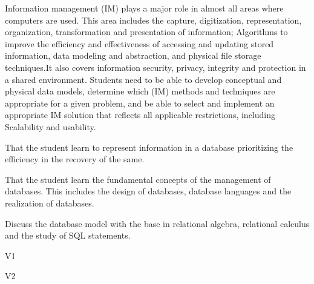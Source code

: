 \begin{syllabus}


\begin{justification}
Information management (IM) plays a major role in almost all areas where computers are used. 
This area includes the capture, digitization, representation, organization, transformation and presentation of information; 
Algorithms to improve the efficiency and effectiveness of accessing and updating stored information, data modeling and abstraction,
and physical file storage techniques.It also covers information security, privacy, integrity and protection in a shared environment. 
Students need to be able to develop conceptual and physical data models, determine which (IM) methods and techniques 
are appropriate for a given problem, and be able to select and implement an appropriate IM solution 
that reflects all applicable restrictions, including Scalability and usability.
\end{justification}

\begin{goals}
\item That the student learn to represent information in a database prioritizing the efficiency in the recovery of the same.
\item That the student learn the fundamental concepts of the management of databases. This includes the design of databases, database languages and the realization of databases.
\item Discuss the database model with the base in relational algebra, relational calculus and the study of SQL statements.
\end{goals}

\begin{outcomes}{V1}
    \item {}
    \item {}
    \item {}
    \item {}
\end{outcomes}

\begin{outcomes}{V2}
    \item {}
    \item {}
    \item {}
\end{outcomes}


\end{syllabus}
